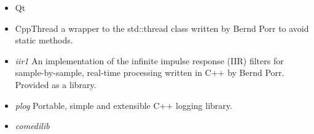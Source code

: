 \begin{itemize}
\item Qt %
\item CppThread a wrapper to the std::thread class written by Bernd Porr to avoid static methods. %
\item \emph{iir1} An implementation of the infinite impulse response (IIR) filters for sample-by-sample, real-time processing written in C++ by Bernd Porr. Provided as a library.%
\item \emph{plog} Portable, simple and extensible C++ logging library. %
\item \emph{comedilib} 
\end{itemize}

